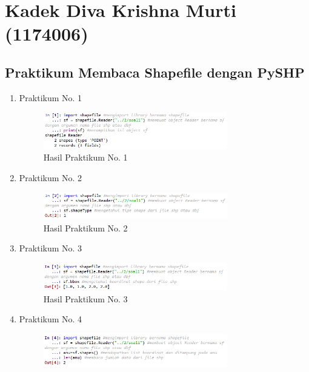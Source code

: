 \section{Kadek Diva Krishna Murti (1174006)}
\subsection{Praktikum Membaca Shapefile dengan PySHP}
\begin{enumerate}
    \item Praktikum No. 1
    
    \hfill\break
    \begin{figure}[H]
		\includegraphics[width=8cm]{figures/1174006/3/soal1.png}
		\centering
		\caption{Hasil Praktikum No. 1}
    \end{figure}
	\item Praktikum No. 2
	
	\hfill\break
	\begin{figure}[H]
		\includegraphics[width=8cm]{figures/1174006/3/soal2.png}
		\centering
		\caption{Hasil Praktikum No. 2}
	\end{figure}
	\item Praktikum No. 3
	
	\hfill\break
	\begin{figure}[H]
		\includegraphics[width=8cm]{figures/1174006/3/soal3.png}
		\centering
		\caption{Hasil Praktikum No. 3}
	\end{figure}
	\item Praktikum No. 4
	
	\hfill\break
	\begin{figure}[H]
		\includegraphics[width=8cm]{figures/1174006/3/soal4.png}

\end{figure}
\end{enumerate}
